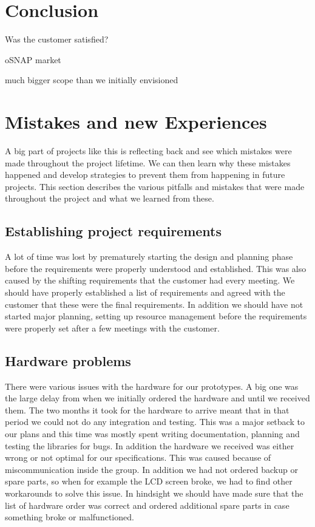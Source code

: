 \section{Conclusion}
Was the customer satisfied?

oSNAP market

much bigger scope than we initially envisioned

\section{Mistakes and new Experiences}
A big part of projects like this is reflecting back and see which mistakes were made throughout
the project lifetime. We can then learn why these mistakes happened and develop strategies to
prevent them from happening in future projects. This section describes the various pitfalls and
mistakes that were made throughout the project and what we learned from these.

\subsection{Establishing project requirements}
A lot of time was lost by prematurely starting the design and planning phase before the
requirements were properly understood and established. This was also caused by the shifting 
requirements that the customer had every meeting. We should have properly established a list of
requirements and agreed with the customer that these were the final requirements. In addition we
should have not started major planning, setting up resource management before the requirements
were properly set after a few meetings with the customer.

\subsection{Hardware problems}
There were various issues with the hardware for our prototypes. A big one was the large delay
from when we initially ordered the hardware and until we received them. The two months it took
for the hardware to arrive meant that in that period we could not do any integration and testing.
This was a major setback to our plans and this time was mostly spent writing documentation, planning
and testing the libraries for bugs. In addition the hardware we received was either wrong or not
optimal for our specifications. This was caused because of miscommunication inside the group. In
addition we had not ordered backup or spare parts, so when for example the LCD screen broke,
we had to find other workarounds to solve this issue. In hindsight we should have made sure that
the list of hardware order was correct and ordered additional spare parts in case something broke
or malfunctioned.

